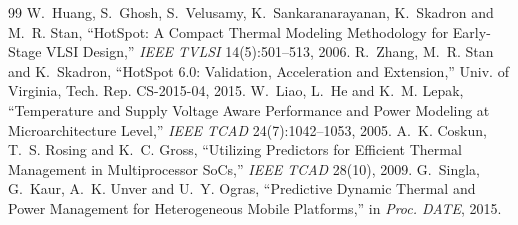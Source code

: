 \documentclass[11pt,a4paper]{article}
\begin{document}
\begin{thebibliography}{99}\small
\setlength{\itemsep}{0pt}
 W.~Huang, S.~Ghosh, S.~Velusamy, K.~Sankaranarayanan, K.~Skadron and
  M.~R. Stan, ``HotSpot: A Compact Thermal Modeling Methodology for Early-Stage VLSI Design,''
  \emph{IEEE TVLSI} 14(5):501--513, 2006.
 R.~Zhang, M.~R. Stan and K.~Skadron, ``HotSpot 6.0: Validation, Acceleration
  and Extension,'' Univ. of Virginia, Tech. Rep. CS-2015-04, 2015.
 W.~Liao, L.~He and K.~M. Lepak, ``Temperature and Supply Voltage Aware
  Performance and Power Modeling at Microarchitecture Level,'' \emph{IEEE TCAD} 24(7):1042--1053,
  2005.
 A.~K. Coskun, T.~S. Rosing and K.~C. Gross, ``Utilizing Predictors for
  Efficient Thermal Management in Multiprocessor SoCs,'' \emph{IEEE TCAD} 28(10), 2009.
 G.~Singla, G.~Kaur, A.~K. Unver and U.~Y. Ogras, ``Predictive Dynamic Thermal
  and Power Management for Heterogeneous Mobile Platforms,'' in \emph{Proc. DATE}, 2015.
\end{thebibliography}
\end{document}

